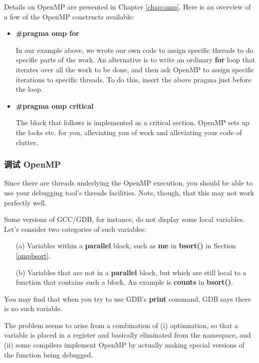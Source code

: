 Details on OpenMP are presented in Chapter \ref{chap:omp}.  Here is an
overview of a few of the OpenMP constructs available:

\begin{itemize}

\item \textbf{\#pragma omp for}

In our example above, we wrote our own code to assign specific threads to
do specific parts of the work.  An alternative is to write an ordinary
{\bf for} loop that iterates over all the work to be done, and then ask
OpenMP to assign specific iterations to specific threads.  To do this,
insert the above pragma just before the loop.

\item \textbf{\#pragma omp critical}

The block that follows is implemented as a critical section.  OpenMP
sets up the locks etc. for you, alleviating you of work and alleviating
your code of clutter.

\end{itemize}

\subsubsection{调试 OpenMP}

Since there are threads underlying the OpenMP execution, you should be
able to use your debugging tool's threads facilities.  Note, though,
that this may not work perfectly well.

Some versions of GCC/GDB, for instance, do not display some local
variables.  Let's consider two categories of such variables:

\begin{itemize}

\item [(a)] Variables within a {\bf parallel} block, such as {\bf me}
in {\bf bsort()} in Section \ref{ompbsort}.

\item [(b)] Variables that are not in a {\bf parallel} block, but which
are still local to a function that contains such a block.  An example is
{\bf counts} in {\bf bsort()}.

\end{itemize}

You may find that when you try to use GDB's {\bf print} command, GDB
says there is no such variable.

The problem seems to arise from a combination of (i) optimzation, so
that a variable is placed in a register and basically eliminated from
the namespace, and (ii) some compilers implement OpenMP by actually
making special versions of the function being debugged.

